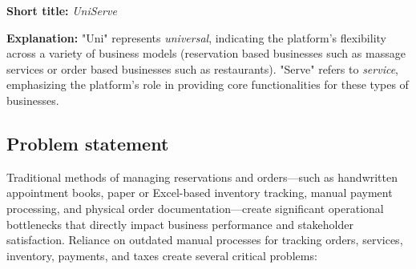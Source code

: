 \documentclass[]{VUMIFTemplateClass}
\begin{document}
\textbf{Short title:} \textit{UniServe}


\textbf{Explanation:} "Uni" represents \emph{universal}, indicating the platform's flexibility across a variety of business models 
(reservation based businesses such as massage services or order based businesses such as restaurants). 
"Serve" refers to \emph{service}, emphasizing the platform’s role in providing core functionalities for these types of businesses.

\subsection{Problem statement}

Traditional methods of managing reservations and orders—such as handwritten
appointment books, paper or Excel-based inventory tracking, manual payment processing,
and physical order documentation—create significant operational bottlenecks that
directly impact business performance and stakeholder satisfaction. Reliance on
outdated manual processes for tracking orders, services, inventory, payments,
and taxes create several critical problems:
\end{document}
